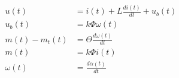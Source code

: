\begin{gather}
\begin{align*} 
\label{eq:dc_dt}
u(t) &= i(t) + L\frac{di(t)}{dt} + u_b(t) \\ 
u_b(t) &= k\Phi{}\omega{}(t) \\
m(t) - m_t(t) &= \Theta{}\frac{d\omega{}(t)}{dt} \\
m(t) &= k\Phi{}i(t) \\
\omega{}(t) &= \frac{d\alpha(t)}{dt}
\end{align*}
\end{gather}